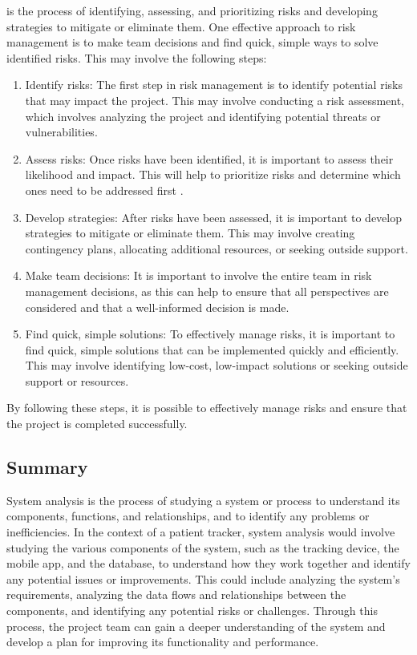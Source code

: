 \documentclass[12pt]{article}
\begin{document}
				\quad is the process of identifying, assessing, and prioritizing risks and developing strategies to mitigate or eliminate them. One effective approach to risk management is to make team decisions and find quick, simple ways to solve identified risks\cite{book1}. This may involve the following steps:
				\begin{enumerate}
					\item Identify risks: The first step in risk management is to identify potential risks that may impact the project. This may involve conducting a risk assessment, which involves analyzing the project and identifying potential threats or vulnerabilities.
					\item Assess risks: Once risks have been identified, it is important to assess their likelihood and impact. This will help to prioritize risks and determine which ones need to be addressed first \cite{book2}.
					\item Develop strategies: After risks have been assessed, it is important to develop strategies to mitigate or eliminate them. This may involve creating contingency plans, allocating additional resources, or seeking outside support.
					\item Make team decisions: It is important to involve the entire team in risk management decisions, as this can help to ensure that all perspectives are considered and that a well-informed decision is made.
					\item Find quick, simple solutions: To effectively manage risks, it is important to find quick, simple solutions that can be implemented quickly and efficiently. This may involve identifying low-cost, low-impact solutions or seeking outside support or resources.
				\end{enumerate}
			
					By following these steps, it is possible to effectively manage risks and ensure that the project is completed successfully.
		\subsection{Summary}
			
			\quad System analysis is the process of studying a system or process to understand its components, functions, and relationships, and to identify any problems or inefficiencies. In the context of a patient tracker, system analysis would involve studying the various components of the system, such as the tracking device, the mobile app, and the database, to understand how they work together and identify any potential issues or improvements. This could include analyzing the system's requirements, analyzing the data flows and relationships between the components, and identifying any potential risks or challenges. Through this process, the project team can gain a deeper understanding of the system and develop a plan for improving its functionality and performance.
			\newpage
\end{document}
